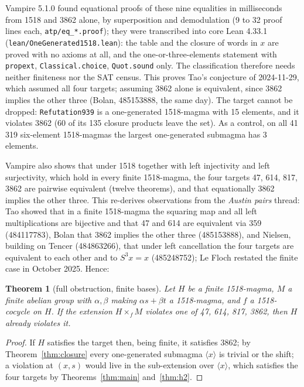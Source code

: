 \documentclass[11pt]{article}
\newtheorem{theorem}{Theorem}
\theoremstyle{remark}\newtheorem*{remark}{Remark}
\begin{document}
Vampire 5.1.0 found equational proofs of these nine equalities in milliseconds from 1518 and 3862 alone, by superposition and demodulation (9 to 32 proof lines each, \texttt{atp/eq\_*.proof}); they were transcribed into core Lean 4.33.1 (\texttt{lean/OneGenerated1518.lean}): the table and the closure of words in $x$ are proved with no axioms at all, and the one-or-three-elements statement with \texttt{propext}, \texttt{Classical.choice}, \texttt{Quot.sound} only. The classification therefore needs neither finiteness nor the SAT census. This proves Tao's conjecture of 2024-11-29, which assumed all four targets; assuming 3862 alone is equivalent, since 3862 implies the other three (Bolan, 485153888, the same day). The target cannot be dropped: \texttt{Refutation939} is a one-generated 1518-magma with 15 elements, and it violates 3862 (60 of its 135 closure products leave the set). As a control, on all 41\,319 six-element 1518-magmas the largest one-generated submagma has 3 elements.

Vampire also shows that under 1518 together with left injectivity and left surjectivity, which hold in every finite 1518-magma, the four targets 47, 614, 817, 3862 are pairwise equivalent (twelve theorems), and that equationally 3862 implies the other three. This re-derives observations from the \emph{Austin pairs} thread: Tao showed that in a finite 1518-magma the squaring map and all left multiplications are bijective and that 47 and 614 are equivalent via 359 (484117783), Bolan that 3862 implies the other three (485153888), and Nielsen, building on Tencer (484863266), that under left cancellation the four targets are equivalent to each other and to $S^3x=x$ (485248752); Le Floch restated the finite case in October 2025. Hence:

\begin{theorem}[full obstruction, finite bases]\label{thm:full}
Let $H$ be a finite 1518-magma, $M$ a finite abelian group with $\alpha,\beta$ making $\alpha s+\beta t$ a 1518-magma, and $f$ a 1518-cocycle on $H$. If the extension $H\times_f M$ violates one of 47, 614, 817, 3862, then $H$ already violates it.
\end{theorem}

\begin{proof}
If $H$ satisfies the target then, being finite, it satisfies 3862; by Theorem~\ref{thm:closure} every one-generated submagma $\langle x\rangle$ is trivial or the shift; a violation at $(x,s)$ would live in the sub-extension over $\langle x\rangle$, which satisfies the four targets by Theorems~\ref{thm:main} and~\ref{thm:h2}.
\end{proof}
\end{document}
